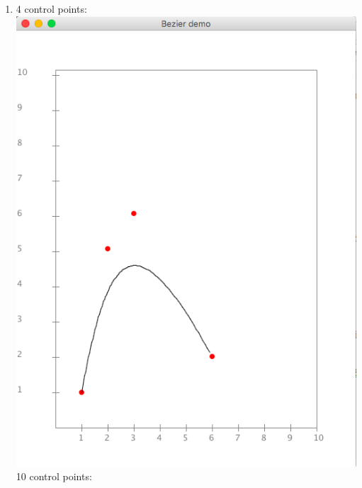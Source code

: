 \documentclass{article}
\begin{document}
\begin{enumerate}
\item 4 control points: \\
\includegraphics[scale=0.3]{exercise28_4}\\
10 control points:\\

\end{enumerate}
\end{document}
